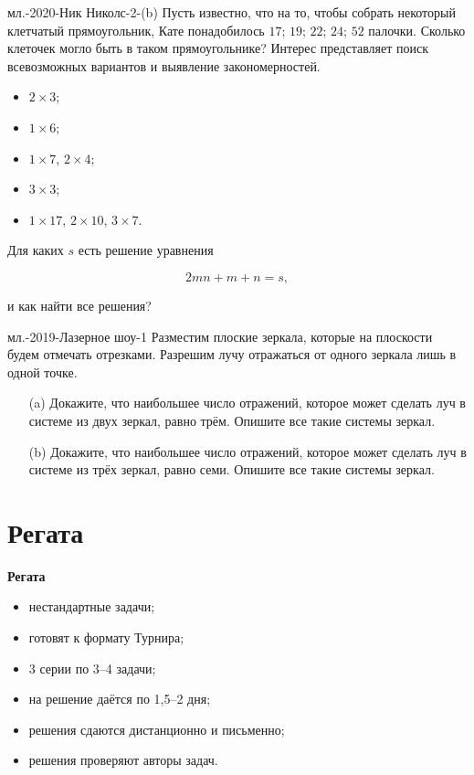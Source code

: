 \documentclass[aspectratio=1610,11pt]{beamer}
\newcommand\fram[2]{\begin{frame}{\bf #1} #2 \end{frame}}
\newcommand\framm[1]{\begin{frame} #1 \end{frame}}
\def\usl#1#2{\begin{block}{#1} #2 \end{block} \medskip\pause}
\def\uslnp#1#2{\begin{block}{#1} #2 \end{block} \medskip}
\begin{document}
\framm{
\usl{мл.-2020-Ник Николс-2-(b)}{
Пусть известно, что на то, чтобы собрать некоторый клетчатый прямоугольник, Кате понадобилось $17$; $19$; $22$; $24$; $52$ палочки. Сколько клеточек могло быть в таком прямоугольнике? Интерес представляет поиск всевозможных вариантов и выявление закономерностей.
}\vspace{-2mm}

\begin{itemize}
	\item $2 \times 3$;
	\item $1 \times 6$;
	\item $1 \times 7$, $2 \times 4$;
	\item $3 \times 3$;
	\item $1 \times 17$, $2 \times 10$, $3 \times 7$.
\end{itemize} \pause

Для каких $s$ есть решение уравнения \vspace{-4mm}

$$2mn + m + n = s,$$\vspace{-6mm}

и как найти все решения?
}

\framm{
\uslnp{мл.-2019-Лазерное шоу-1}{
Разместим плоские зеркала, которые на плоскости будем отмечать отрезками. Разрешим лучу отражаться от одного зеркала лишь в одной точке.
\begin{enumerate}
\item[(a)] Докажите, что наибольшее число отражений, которое может сделать луч в системе из
двух зеркал, равно трём. Опишите все такие системы зеркал.
\item[(b)] Докажите, что наибольшее число отражений, которое может сделать луч в системе из
трёх зеркал, равно семи. Опишите все такие системы зеркал.
\end{enumerate}
}
}

\section{Регата}
\fram{Регата}{
\large

\begin{itemize}
	\item нестандартные задачи;\vspace{2mm}
	\item готовят к формату Турнира;\vspace{2mm}
	\item 3 серии по 3--4 задачи;\vspace{2mm}
	\item на решение даётся по 1,5--2 дня;\vspace{2mm}
	\item решения сдаются дистанционно и письменно;\vspace{2mm}
	\item решения проверяют авторы задач.
\end{itemize}
}
\end{document}

